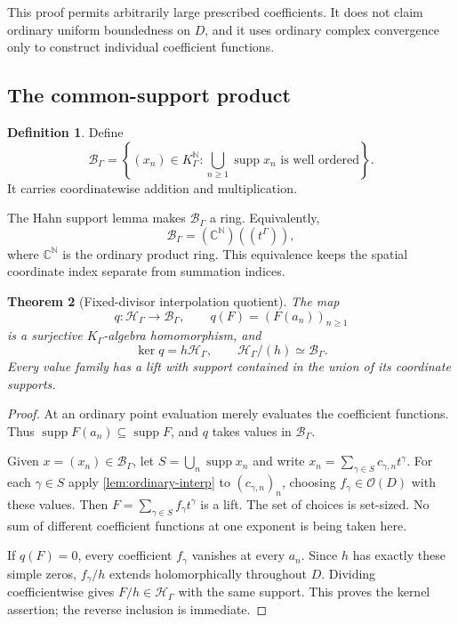 \documentclass[11pt,letterpaper]{article}
\numberwithin{equation}{section}
\newtheorem{theorem}{Theorem}[section]
\theoremstyle{definition}
\newtheorem{definition}[theorem]{Definition}
\theoremstyle{remark}
\newcommand{\C}{\mathbb C}
\newcommand{\N}{\mathbb N}
\newcommand{\OO}{\mathcal O}
\newcommand{\HH}{\mathcal H}
\newcommand{\BB}{\mathcal B}
\newcommand{\supp}{\operatorname{supp}}
\begin{document}
This proof permits arbitrarily large prescribed coefficients. It does
not claim ordinary uniform boundedness on $D$, and it uses ordinary
complex convergence only to construct individual coefficient functions.

\subsection{The common-support product}
\begin{definition}\label{def:B}
Define
\begin{equation}\label{eq:Bdef}
 \BB_\Gamma=\left\{(x_n)\in K_\Gamma^\N:
                 \bigcup_{n\ge1}\supp x_n\text{ is well ordered}\right\}.
\end{equation}
It carries coordinatewise addition and multiplication.
\end{definition}
The Hahn support lemma makes $\BB_\Gamma$ a ring. Equivalently,
\[
 \BB_\Gamma=(\C^\N)((t^\Gamma)),
\]
where $\C^\N$ is the ordinary product ring. This equivalence keeps the
spatial coordinate index separate from summation indices.

\begin{theorem}[Fixed-divisor interpolation quotient]\label{thm:quotient}
The map
\[
 q:\HH_\Gamma\longrightarrow\BB_\Gamma,\qquad
 q(F)=(F(a_n))_{n\ge1}
\]
is a surjective $K_\Gamma$-algebra homomorphism, and
\begin{equation}\label{eq:quotient}
 \ker q=h\HH_\Gamma,\qquad
 \HH_\Gamma/(h)\simeq\BB_\Gamma.
\end{equation}
Every value family has a lift with support contained in the union of its
coordinate supports.
\end{theorem}
\begin{proof}
At an ordinary point evaluation merely evaluates the coefficient
functions. Thus $\supp F(a_n)\subseteq\supp F$, and $q$ takes values in
$\BB_\Gamma$.

Given $x=(x_n)\in\BB_\Gamma$, let $S=\bigcup_n\supp x_n$ and write
$x_n=\sum_{\gamma\in S}c_{\gamma,n}t^\gamma$. For each $\gamma\in S$
apply \cref{lem:ordinary-interp} to $(c_{\gamma,n})_n$, choosing
$f_\gamma\in\OO(D)$ with these values. Then
$F=\sum_{\gamma\in S}f_\gamma t^\gamma$ is a lift. The set of choices is
set-sized. No sum of different coefficient functions at one exponent is
being taken here.

If $q(F)=0$, every coefficient $f_\gamma$ vanishes at every $a_n$.
Since $h$ has exactly these simple zeros, $f_\gamma/h$ extends
holomorphically throughout $D$. Dividing coefficientwise gives
$F/h\in\HH_\Gamma$ with the same support. This proves the kernel
assertion; the reverse inclusion is immediate.
\end{proof}
\end{document}
